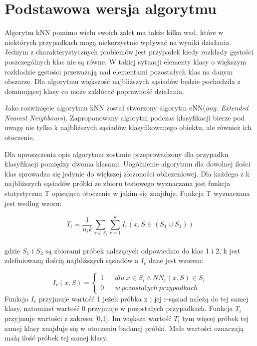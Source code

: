 \documentclass[12pt]{report}
\begin{document}
\section{Podstawowa wersja algorytmu}
\large{Algorytm kNN pomimo wielu swoich zalet ma także kilka wad, które w niektórych przypadkach mogą niekorzystnie wpływać na wyniki działania. Jednym z charakterystycznych problemów jest przypadek kiedy rozkłady gęstości poszczególnych klas nie są równe. W takiej sytuacji elementy klasy o większym rozkładzie gęstości przeważają nad elementami pozostałych klas na danym obszarze. Dla algorytmu większość najbliższych sąsiadów będzie pochodziła z dominującej klasy co może zakłócać poprawność działania.

Jako rozwinięcie algorytmu kNN został stworzony algorytm eNN(\textit{ang. Extended Nearest Neighbours}). Zaproponowany algorytm podczas klasyfikacji bierze pod uwagę nie tylko  k najbliższych sąsiadów klasyfikowanego obiektu, ale również ich otoczenie. 

Dla uproszczenia opis algorytmu zostanie przeprowadzony dla przypadku klasyfikacji pomiędzy dwoma klasami. Uogólnienie algorytmu dla dowolnej ilości klas sprowadza się jedynie do większej złożoności obliczeniowej. Dla każdego z k najbliższych sąsiadów próbki ze zbioru testowego wyznaczana jest funkcja statystyczna T opisująca otoczenie w jakim się znajduje. Funkcja T wyznaczana jest według wzoru:

\begin{equation}
T_{i} = \frac{1}{n_i k} {\sum_{x \in S_i} \sum_{r=1}^{k} I_r (x,S \in (S_1 \cup S_2))} 
\end{equation}\\
gdzie $S_1$ i $S_2$ są zbiorami próbek należących odpowiednio do klas 1 i 2, k jest zdefiniowaną ilością najbliższych sąsiadów a $I_r$ dane jest wzorem:

\begin{equation}
I_r(x,S) =\left\{\begin{matrix}
1 &&	dla\ x \in S_i \wedge NN_{r}(x,S) \in S_i
\\
0 &&	w\ pozostałych\ przypadkach
\end{matrix}\right.
\end{equation}
Funkcja $I_r$ przyjmuje wartość 1 jeżeli próbka x i jej r-sąsiad należą do tej samej klasy, natomiast wartość 0 przyjmuje w pozostałych przypadkach.
Funkcja $T_i$ przyjmuje wartości z zakresu [0,1]. Im większa wartość $T_i$ tym więcej próbek tej samej klasy znajduje się w otoczeniu badanej próbki. Małe wartości oznaczają małą ilość próbek tej samej klasy.

}
\end{document}
